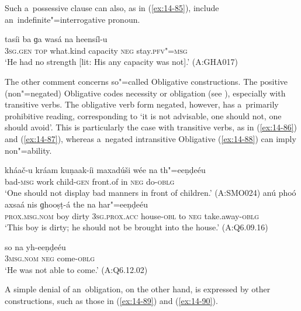 Such a~possessive clause can also, as in (\ref{ex:14-85}), include an~indefinite"=interrogative pronoun.

\begin{exe}
\ex
\label{ex:14-85}
\gll tasíi ba ɡa wasá na heensíl-u \\
\textsc{3sg.gen} \textsc{top} what.kind capacity \textsc{neg} stay.\textsc{pfv"=msg } \\
\glt `He had no strength [lit: His any capacity was not].' (A:GHA017)
\end{exe}

The other comment concerns so"=called Obligative constructions. The positive (non"=negated) Obligative codes necessity or obligation (see ), especially with transitive verbs. The obligative verb form negated, however, has a~primarily prohibitive reading, corresponding to `it is not advisable, one should not, one should avoid'. This is particularly the case with transitive verbs, as in (\ref{ex:14-86}) and (\ref{ex:14-87}), whereas a~negated intransitive Obligative (\ref{ex:14-88}) can imply non"=ability.

\begin{exe}
\ex
\label{ex:14-86}
\gll kháač-u kráam kuṇaak-íi maxadúši wée na  th"=eeṇḍeéu \\
bad-\textsc{msg} work child-\textsc{gen} front.of in \textsc{neg} do-\textsc{oblg } \\
\glt `One should not display bad manners in front of children.' (A:SMO024)
\ex
\label{ex:14-87}
\gll anú phoó axsaá nis ɡhooṣṭ-á the na har"=eeṇḍeéu\\
\textsc{prox.msg.nom} boy dirty \textsc{3sg.prox.acc} house-\textsc{obl} to \textsc{neg} take.away-\textsc{oblg}\\
\glt `This boy is dirty; he should not be brought into the house.' (A:Q6.09.16)

\ex
\label{ex:14-88}
\gll so na yh-eeṇḍeéu\\
\textsc{3msg}.\textsc{nom} \textsc{neg} come-\textsc{oblg}\\
\glt `He was not able to come.' (A:Q6.12.02)
\end{exe}

A simple denial of an~obligation, on the other hand, is expressed by other constructions, such as those in (\ref{ex:14-89}) and (\ref{ex:14-90}).

